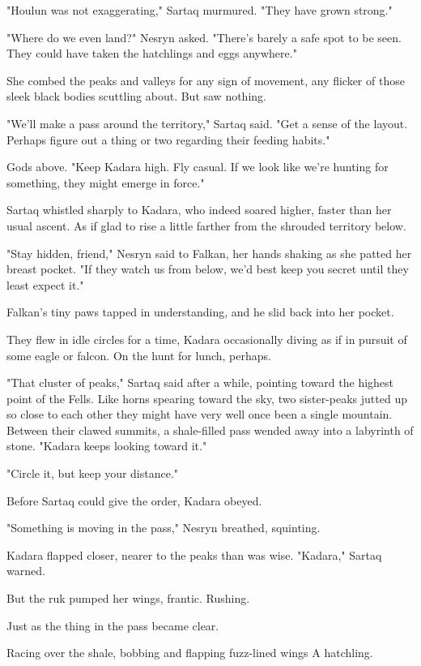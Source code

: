 "Houlun was not exaggerating," Sartaq murmured. "They have grown strong."

"Where do we even land?" Nesryn asked. "There's barely a safe spot to be seen. They could have taken the hatchlings and eggs anywhere."

She combed the peaks and valleys for any sign of movement, any flicker of those sleek black bodies scuttling about. But saw nothing.

"We'll make a pass around the territory," Sartaq said. "Get a sense of the layout. Perhaps figure out a thing or two regarding their feeding habits."

Gods above. "Keep Kadara high. Fly casual. If we look like we're hunting for something, they might emerge in force."

Sartaq whistled sharply to Kadara, who indeed soared higher, faster than her usual ascent. As if glad to rise a little farther from the shrouded territory below.

"Stay hidden, friend," Nesryn said to Falkan, her hands shaking as she patted her breast pocket. "If they watch us from below, we'd best keep you secret until they least expect it."

Falkan's tiny paws tapped in understanding, and he slid back into her pocket.

They flew in idle circles for a time, Kadara occasionally diving as if in pursuit of some eagle or falcon. On the hunt for lunch, perhaps.

"That cluster of peaks," Sartaq said after a while, pointing toward the highest point of the Fells. Like horns spearing toward the sky, two sister-peaks jutted up so close to each other they might have very well once been a single mountain. Between their clawed summits, a shale-filled pass wended away into a labyrinth of stone. "Kadara keeps looking toward it."

"Circle it, but keep your distance."

Before Sartaq could give the order, Kadara obeyed.

"Something is moving in the pass," Nesryn breathed, squinting.

Kadara flapped closer, nearer to the peaks than was wise. "Kadara," Sartaq warned.

But the ruk pumped her wings, frantic. Rushing.

Just as the thing in the pass became clear.

Racing over the shale, bobbing and flapping fuzz-lined wings  A hatchling.

